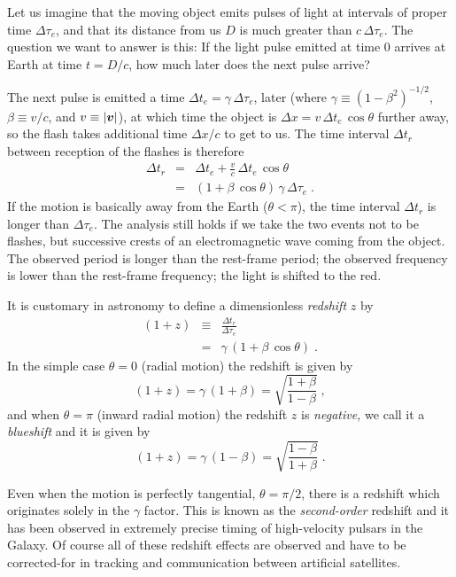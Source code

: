 Let us imagine that the moving object emits pulses of light at
intervals of proper time $\Delta\tau_e$, and that its distance from us
$D$ is much greater than $c\,\Delta\tau_e$.  The question
we want to answer is this: If the light pulse emitted at time $0$
arrives at Earth at time $t=D/c$, how much later does the next pulse
arrive?

The next pulse is emitted a time $\Delta t_e=\gamma\,\Delta\tau_e$,
later (where $\gamma\equiv(1-\beta^2)^{-1/2}$, $\beta\equiv v/c$, and
$v\equiv |\mbox{\boldmath $v$}|$), at which time the object is $\Delta x=v\,\Delta
t_e\,\cos\theta$ further away, so the flash takes additional time
$\Delta x/c$ to get to us.  The time interval $\Delta t_r$ between
reception of the flashes is therefore
\begin{eqnarray}
\Delta t_r & = & \Delta t_e + \frac{v}{c}\,\Delta t_e\,\cos\theta \nonumber\\
& = & (1 + \beta\,\cos\theta)\,\gamma\,\Delta\tau_e \; .
\end{eqnarray}
If the motion is basically away from the Earth ($\theta<\pi$), the
time interval $\Delta t_r$ is longer than $\Delta\tau_e$.  The
analysis still holds if we take the two events not to be flashes, but
successive crests of an electromagnetic wave coming from the object.
The observed period is longer than the rest-frame period; the
observed frequency is lower than the rest-frame frequency; the
light is shifted to the red.

It is customary in astronomy to define a dimensionless {\em
redshift\/} $z$ by
\begin{eqnarray}
(1+z) & \equiv & \frac{\Delta t_r}{\Delta\tau_e} \nonumber\\
& = & \gamma\,(1+\beta\,\cos\theta) \; .
\end{eqnarray}
In the simple case $\theta=0$ (radial motion) the redshift is given by
\begin{equation}
(1+z) = \gamma\,(1+\beta) = \sqrt{\frac{1+\beta}{1-\beta}} \; ,
\end{equation}
and when $\theta=\pi$ (inward radial motion) the redshift $z$ is
{\em negative,\/} we call it a {\em blueshift\/} and it is given by
\begin{equation}
(1+z) = \gamma\,(1-\beta) = \sqrt{\frac{1-\beta}{1+\beta}} \; .
\end{equation}

Even when the motion is perfectly tangential, $\theta=\pi/2$, there is
a redshift which originates solely in the $\gamma$ factor.  This is
known as the {\em second-order\/} redshift and it has been observed in
extremely precise timing of high-velocity pulsars in the Galaxy.  Of
course all of these redshift effects are observed and have to be
corrected-for in tracking and communication between artificial
satellites.

